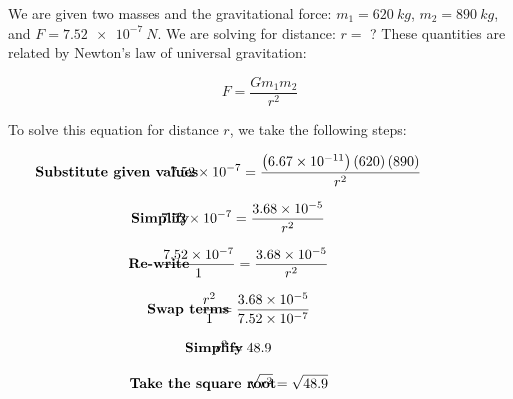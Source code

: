 \documentclass[main.tex]{subfiles}
\begin{document}
\Solution We are given two masses and the gravitational force: $m_1 = \SI{620}{kg}$, $m_2 = \SI{890}{kg}$, and $F = \SI{7.52e-7}{N}$. We are solving for distance: $r=$ ? These quantities are related by Newton's law of universal gravitation:

\begin{equation*}
    F = \frac{G m_1 m_2}{r^2}
\end{equation*}

To solve this equation for distance $r$, we take the following steps:

\begin{align*}
    \hspace{-3.5em} & \textbf{Substitute given values} & \hspace{-3em} &
    \SI{7.52e-7}{} = \frac{
        \left(\SI{6.67e-11}{}\right)
        \left(620\right)
        \left(890\right)
    }{r^2}
\end{align*}

\begin{align*}
    \hspace{-3.5em} & \textbf{Simplify} & \hspace{-3em} &
    \SI{7.52e-7}{} = \frac{\SI{3.68e-5}{}}{r^2}
\end{align*}

\begin{align*}
    \hspace{-3.5em} & \textbf{Re-write} & \hspace{-3em} &
    \frac{\SI{7.52e-7}{}}{1} = \frac{\SI{3.68e-5}{}}{r^2}
\end{align*}

\begin{align*}
    \hspace{-3.5em} & \textbf{Swap terms} & \hspace{-3em} &
    \frac{r^2}{1} = \frac{\SI{3.68e-5}{}}{\SI{7.52e-7}{}}
\end{align*}


\begin{align*}
    \hspace{-3.5em} & \textbf{Simplify} & \hspace{-3em} &
    r^2 = 48.9
\end{align*}

\begin{align*}
    \hspace{-3.5em} & \textbf{Take the square root} & \hspace{-3em} &
    \sqrt{r^2} = \sqrt{48.9}
\end{align*}
\end{document}
